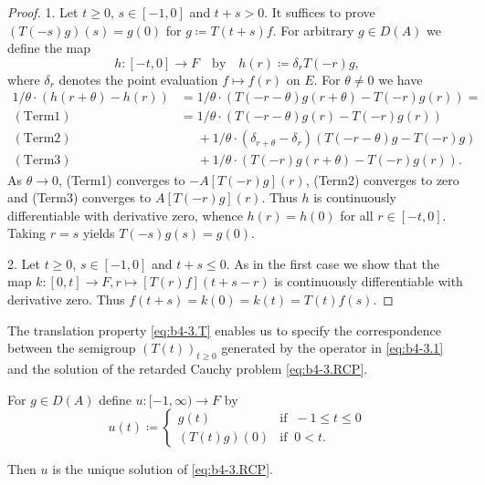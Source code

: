 \begin{proof}
1. Let $t \geq 0$, $s \in [-1,0]$ and $t+s  >  0$.
It suffices to prove $(T(-s)g)(s) = g(0)$ for $g  \coloneq  T(t+s)f$.
For arbitrary $g \in D(A)$ we define the map
\[
h \colon [-t,0] \to F \quad \text{by} \quad h(r) \coloneq  \delta_{r}T(-r)g ,
\]
where $\delta_{r}$ denotes the point evaluation $f \mapsto f(r)$ on $E$.
For $\theta \neq 0$ we have
\begin{align*}
	1/\theta\cdot(h(r+\theta) - h(r)) & = 1/\theta\cdot(T(-r-\theta)g(r+\theta) - T(-r)g(r)) =\\
	(\mathrm{Term1})\quad  &= 1/\theta\cdot(T(-r-\theta)g(r) - T(-r)g(r)) \\
	(\mathrm{Term2})\quad  &\phantom{= }  + 1/\theta\cdot(\delta_{r+\theta} - \delta_{r})(T(-r-\theta)g - T(-r)g) \\
	(\mathrm{Term3})\quad &\phantom{= }  + 1/\theta\cdot(T(-r)g(r+\theta) - T(-r)g(r)).
\end{align*}
As $\theta \to 0$, (Term1) converges to $-A[T(-r)g](r)$, (Term2) converges to zero and (Term3) converges to $A[T(-r)g](r)$.
Thus $h$ is continuously differentiable with derivative zero, whence $h(r) = h(0)$ for all $r \in [-t,0]$.
Taking $r = s$ yields $T(-s)g(s) = g(0)$.

2. Let $t \geq 0$, $s \in [-1,0]$ and $t+s \leq 0$.
As in the first case we show that the map $k \colon [0,t] \to F , r \mapsto [T(r)f](t+s-r)$ is continuously differentiable with derivative zero.
Thus $f(t+s) = k(0) = k(t) = T(t)f(s)$.
\end{proof}
The translation property \eqref{eq:b4-3.T} enables us to specify the correspondence between the semigroup $(T(t))_{t\geq 0}$ generated by the operator in \eqref{eq:b4-3.1} and the solution of the retarded Cauchy problem \eqref{eq:b4-3.RCP}.
\begin{corollary}\label{cor:b4-3.2}
	For $g \in D(A)$ define $u \colon [-1,\infty) \to F$ by
	\[u(t)  \coloneq  \begin{cases}
		g(t) & \text{if } \ -1 \leq t \leq 0 \\
		(T(t)g)(0) & \text{if } \ 0 < t.
	\end{cases}\]
	
	Then $u$ is the unique solution of \eqref{eq:b4-3.RCP}.
\end{corollary}
